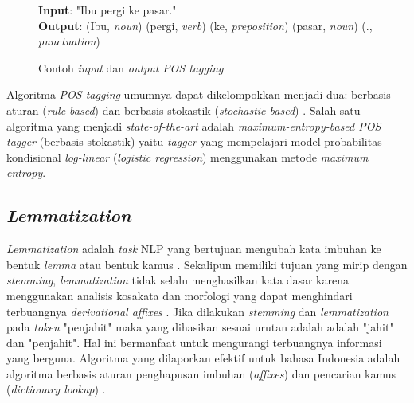 \begin{figure}
	\begin{mdframed}
		\textbf{Input}: "Ibu pergi ke pasar." \\		
		\textbf{Output}: (Ibu, \textit{noun}) (pergi, \textit{verb}) (ke, \textit{preposition}) (pasar, \textit{noun}) (., \textit{punctuation})
	\end{mdframed}
	\caption{Contoh \textit{input} dan \textit{output} \textit{POS tagging}}
	\label{fig:example_pos_tagging}
\end{figure}

Algoritma \textit{POS tagging} umumnya dapat dikelompokkan menjadi dua: berbasis aturan (\textit{rule-based}) dan berbasis stokastik (\textit{stochastic-based}) \citep{jurafsky2000speech}. Salah satu algoritma yang menjadi \textit{state-of-the-art} adalah \textit{maximum-entropy-based POS tagger} (berbasis stokastik) yaitu \textit{tagger} yang mempelajari model probabilitas kondisional \textit{log-linear} (\textit{logistic regression}) menggunakan metode \textit{maximum entropy}.


\subsection{\textit{Lemmatization}}

\textit{Lemmatization} adalah \textit{task} NLP yang bertujuan mengubah kata imbuhan ke bentuk \textit{lemma} atau bentuk kamus \citep{suhartono2014lemmatization}. Sekalipun memiliki tujuan yang mirip dengan \textit{stemming}, \textit{lemmatization} tidak selalu menghasilkan kata dasar karena menggunakan analisis kosakata dan morfologi yang dapat menghindari terbuangnya \textit{derivational affixes} \citep{manning2008introduction}. Jika dilakukan \textit{stemming} dan \textit{lemmatization} pada \textit{token} "penjahit" maka yang dihasikan sesuai urutan adalah adalah "jahit" dan "penjahit". Hal ini bermanfaat untuk mengurangi terbuangnya informasi yang berguna. Algoritma yang dilaporkan efektif untuk bahasa Indonesia adalah algoritma berbasis aturan penghapusan imbuhan (\textit{affixes}) dan pencarian kamus (\textit{dictionary lookup}) \citep{suhartono2014lemmatization}.

